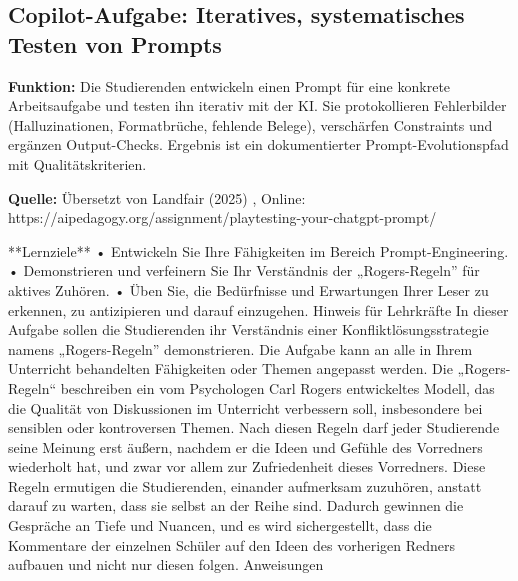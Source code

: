 \documentclass[
  ngerman,
  letterpaper,
  DIV=11]{scrreprt}
\newenvironment{Shaded}{\begin{snugshade}}{\end{snugshade}}
\newcommand{\NormalTok}[1]{\textcolor[rgb]{0.00,0.23,0.31}{#1}}
\begin{document}
\subsection{Copilot-Aufgabe: Iteratives, systematisches Testen von
Prompts}\label{sec-prompt-testen}

\textbf{Funktion:} Die Studierenden entwickeln einen Prompt für eine
konkrete Arbeitsaufgabe und testen ihn iterativ mit der KI. Sie
protokollieren Fehlerbilder (Halluzinationen, Formatbrüche, fehlende
Belege), verschärfen Constraints und ergänzen Output-Checks. Ergebnis
ist ein dokumentierter Prompt-Evolutionspfad mit Qualitätskriterien.

\textbf{Quelle:} Übersetzt von Landfair (2025) , Online:
https://aipedagogy.org/assignment/playtesting-your-chatgpt-prompt/

\begin{tcolorbox}[enhanced jigsaw, left=2mm, bottomrule=.15mm, arc=.35mm, rightrule=.15mm, colframe=quarto-callout-note-color-frame, coltitle=black, colback=white, toprule=.15mm, toptitle=1mm, colbacktitle=quarto-callout-note-color!10!white, title=\textcolor{quarto-callout-note-color}{\faInfo}\hspace{0.5em}{Copilot-Aufgabe: Prompt-Testen}, opacitybacktitle=0.6, leftrule=.75mm, bottomtitle=1mm, titlerule=0mm, opacityback=0, breakable]

\begin{Shaded}
\begin{Highlighting}[]
\NormalTok{**Lernziele**}
\NormalTok{•   Entwickeln Sie Ihre Fähigkeiten im Bereich Prompt{-}Engineering.}
\NormalTok{•   Demonstrieren und verfeinern Sie Ihr Verständnis der „Rogers{-}Regeln” für aktives Zuhören.}
\NormalTok{•   Üben Sie, die Bedürfnisse und Erwartungen Ihrer Leser zu erkennen, zu antizipieren und darauf einzugehen.}
\NormalTok{Hinweis für Lehrkräfte}
\NormalTok{In dieser Aufgabe sollen die Studierenden ihr Verständnis einer Konfliktlösungsstrategie namens „Rogers{-}Regeln” demonstrieren. Die Aufgabe kann an alle in Ihrem Unterricht behandelten Fähigkeiten oder Themen angepasst werden. Die „Rogers{-}Regeln“ beschreiben ein vom Psychologen Carl Rogers entwickeltes Modell, das die Qualität von Diskussionen im Unterricht verbessern soll, insbesondere bei sensiblen oder kontroversen Themen. Nach diesen Regeln darf jeder Studierende seine Meinung erst äußern, nachdem er die Ideen und Gefühle des Vorredners wiederholt hat, und zwar vor allem zur Zufriedenheit dieses Vorredners. Diese Regeln ermutigen die Studierenden, einander aufmerksam zuzuhören, anstatt darauf zu warten, dass sie selbst an der Reihe sind. Dadurch gewinnen die Gespräche an Tiefe und Nuancen, und es wird sichergestellt, dass die Kommentare der einzelnen Schüler auf den Ideen des vorherigen Redners aufbauen und nicht nur diesen folgen.}
\NormalTok{Anweisungen}


\end{Highlighting}
\end{Shaded}
\end{tcolorbox}
\end{document}
